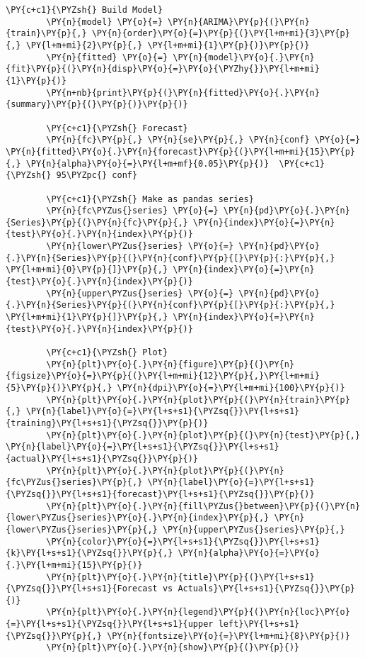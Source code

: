 \begin{tcolorbox}[breakable, size=fbox, boxrule=1pt, pad at break*=1mm,colback=cellbackground, colframe=cellborder]
	\begin{Verbatim}[commandchars=\\\{\}]
		\PY{c+c1}{\PYZsh{} Build Model}
		\PY{n}{model} \PY{o}{=} \PY{n}{ARIMA}\PY{p}{(}\PY{n}{train}\PY{p}{,} \PY{n}{order}\PY{o}{=}\PY{p}{(}\PY{l+m+mi}{3}\PY{p}{,} \PY{l+m+mi}{2}\PY{p}{,} \PY{l+m+mi}{1}\PY{p}{)}\PY{p}{)}  
		\PY{n}{fitted} \PY{o}{=} \PY{n}{model}\PY{o}{.}\PY{n}{fit}\PY{p}{(}\PY{n}{disp}\PY{o}{=}\PY{o}{\PYZhy{}}\PY{l+m+mi}{1}\PY{p}{)}  
		\PY{n+nb}{print}\PY{p}{(}\PY{n}{fitted}\PY{o}{.}\PY{n}{summary}\PY{p}{(}\PY{p}{)}\PY{p}{)}
		
		\PY{c+c1}{\PYZsh{} Forecast}
		\PY{n}{fc}\PY{p}{,} \PY{n}{se}\PY{p}{,} \PY{n}{conf} \PY{o}{=} \PY{n}{fitted}\PY{o}{.}\PY{n}{forecast}\PY{p}{(}\PY{l+m+mi}{15}\PY{p}{,} \PY{n}{alpha}\PY{o}{=}\PY{l+m+mf}{0.05}\PY{p}{)}  \PY{c+c1}{\PYZsh{} 95\PYZpc{} conf}
		
		\PY{c+c1}{\PYZsh{} Make as pandas series}
		\PY{n}{fc\PYZus{}series} \PY{o}{=} \PY{n}{pd}\PY{o}{.}\PY{n}{Series}\PY{p}{(}\PY{n}{fc}\PY{p}{,} \PY{n}{index}\PY{o}{=}\PY{n}{test}\PY{o}{.}\PY{n}{index}\PY{p}{)}
		\PY{n}{lower\PYZus{}series} \PY{o}{=} \PY{n}{pd}\PY{o}{.}\PY{n}{Series}\PY{p}{(}\PY{n}{conf}\PY{p}{[}\PY{p}{:}\PY{p}{,} \PY{l+m+mi}{0}\PY{p}{]}\PY{p}{,} \PY{n}{index}\PY{o}{=}\PY{n}{test}\PY{o}{.}\PY{n}{index}\PY{p}{)}
		\PY{n}{upper\PYZus{}series} \PY{o}{=} \PY{n}{pd}\PY{o}{.}\PY{n}{Series}\PY{p}{(}\PY{n}{conf}\PY{p}{[}\PY{p}{:}\PY{p}{,} \PY{l+m+mi}{1}\PY{p}{]}\PY{p}{,} \PY{n}{index}\PY{o}{=}\PY{n}{test}\PY{o}{.}\PY{n}{index}\PY{p}{)}
		
		\PY{c+c1}{\PYZsh{} Plot}
		\PY{n}{plt}\PY{o}{.}\PY{n}{figure}\PY{p}{(}\PY{n}{figsize}\PY{o}{=}\PY{p}{(}\PY{l+m+mi}{12}\PY{p}{,}\PY{l+m+mi}{5}\PY{p}{)}\PY{p}{,} \PY{n}{dpi}\PY{o}{=}\PY{l+m+mi}{100}\PY{p}{)}
		\PY{n}{plt}\PY{o}{.}\PY{n}{plot}\PY{p}{(}\PY{n}{train}\PY{p}{,} \PY{n}{label}\PY{o}{=}\PY{l+s+s1}{\PYZsq{}}\PY{l+s+s1}{training}\PY{l+s+s1}{\PYZsq{}}\PY{p}{)}
		\PY{n}{plt}\PY{o}{.}\PY{n}{plot}\PY{p}{(}\PY{n}{test}\PY{p}{,} \PY{n}{label}\PY{o}{=}\PY{l+s+s1}{\PYZsq{}}\PY{l+s+s1}{actual}\PY{l+s+s1}{\PYZsq{}}\PY{p}{)}
		\PY{n}{plt}\PY{o}{.}\PY{n}{plot}\PY{p}{(}\PY{n}{fc\PYZus{}series}\PY{p}{,} \PY{n}{label}\PY{o}{=}\PY{l+s+s1}{\PYZsq{}}\PY{l+s+s1}{forecast}\PY{l+s+s1}{\PYZsq{}}\PY{p}{)}
		\PY{n}{plt}\PY{o}{.}\PY{n}{fill\PYZus{}between}\PY{p}{(}\PY{n}{lower\PYZus{}series}\PY{o}{.}\PY{n}{index}\PY{p}{,} \PY{n}{lower\PYZus{}series}\PY{p}{,} \PY{n}{upper\PYZus{}series}\PY{p}{,} 
		\PY{n}{color}\PY{o}{=}\PY{l+s+s1}{\PYZsq{}}\PY{l+s+s1}{k}\PY{l+s+s1}{\PYZsq{}}\PY{p}{,} \PY{n}{alpha}\PY{o}{=}\PY{o}{.}\PY{l+m+mi}{15}\PY{p}{)}
		\PY{n}{plt}\PY{o}{.}\PY{n}{title}\PY{p}{(}\PY{l+s+s1}{\PYZsq{}}\PY{l+s+s1}{Forecast vs Actuals}\PY{l+s+s1}{\PYZsq{}}\PY{p}{)}
		\PY{n}{plt}\PY{o}{.}\PY{n}{legend}\PY{p}{(}\PY{n}{loc}\PY{o}{=}\PY{l+s+s1}{\PYZsq{}}\PY{l+s+s1}{upper left}\PY{l+s+s1}{\PYZsq{}}\PY{p}{,} \PY{n}{fontsize}\PY{o}{=}\PY{l+m+mi}{8}\PY{p}{)}
		\PY{n}{plt}\PY{o}{.}\PY{n}{show}\PY{p}{(}\PY{p}{)}
\end{Verbatim}
\end{tcolorbox}

